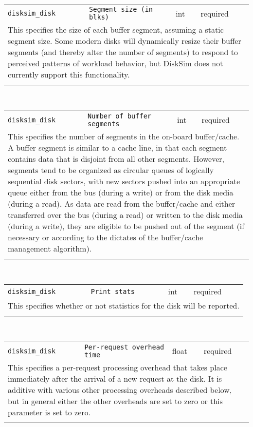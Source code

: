 \noindent 
\begin{tabular}{|p{\lpmodwidth}|p{\lpnamewidth}|p{0.5in}|p{0.5in}|}
\cline{1-4}
\texttt{disksim\_disk} & \texttt{Segment size (in blks)} & int & required \\ 
\cline{1-4}
\multicolumn{4}{|p{6in}|}{
This specifies the size of each buffer segment, assuming a static segment
size. Some modern disks will dynamically resize their buffer segments
(and thereby alter the number of segments) to respond to perceived
patterns of workload behavior, but DiskSim does not currently support
this functionality.
}\\ 
\cline{1-4}
\multicolumn{4}{p{5in}}{}\\
\end{tabular}\\ 
\noindent 
\begin{tabular}{|p{\lpmodwidth}|p{\lpnamewidth}|p{0.5in}|p{0.5in}|}
\cline{1-4}
\texttt{disksim\_disk} & \texttt{Number of buffer segments} & int & required \\ 
\cline{1-4}
\multicolumn{4}{|p{6in}|}{
This specifies the number of segments in the on-board buffer/cache. A
buffer segment is similar to a cache line, in that each segment
contains data that is disjoint from all other segments. However,
segments tend to be organized as circular queues of logically
sequential disk sectors, with new sectors pushed into an appropriate
queue either from the bus (during a write) or from the disk media
(during a read). As data are read from the buffer/cache and either
transferred over the bus (during a read) or written to the disk media
(during a write), they are eligible to be pushed out of the segment
(if necessary or according to the dictates of the buffer/cache
management algorithm).
}\\ 
\cline{1-4}
\multicolumn{4}{p{5in}}{}\\
\end{tabular}\\ 
\noindent 
\begin{tabular}{|p{\lpmodwidth}|p{\lpnamewidth}|p{0.5in}|p{0.5in}|}
\cline{1-4}
\texttt{disksim\_disk} & \texttt{Print stats} & int & required \\ 
\cline{1-4}
\multicolumn{4}{|p{6in}|}{
This specifies whether or not statistics for the disk will be reported.
}\\ 
\cline{1-4}
\multicolumn{4}{p{5in}}{}\\
\end{tabular}\\ 
\noindent 
\begin{tabular}{|p{\lpmodwidth}|p{\lpnamewidth}|p{0.5in}|p{0.5in}|}
\cline{1-4}
\texttt{disksim\_disk} & \texttt{Per-request overhead time} & float & required \\ 
\cline{1-4}
\multicolumn{4}{|p{6in}|}{
This specifies a per-request processing overhead that takes place
immediately after the arrival of a new request at the disk. It is
additive with various other processing overheads described below, but
in general either the other overheads are set to zero or this
parameter is set to zero.
}\\ 
\cline{1-4}
\multicolumn{4}{p{5in}}{}\\
\end{tabular}\\ 

